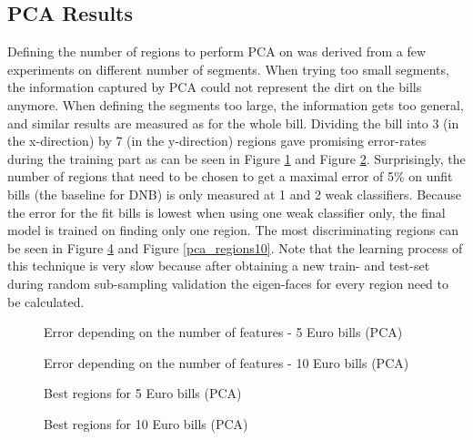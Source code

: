 \documentclass[11pt,twocolumn]{article}
\begin{document}
		\subsection{PCA Results}\label{sec:pca_results}
			Defining the number of regions to perform PCA on was derived from a few experiments on different number of segments. When trying too small segments, the information captured by PCA could not represent the dirt on the bills anymore. When defining the segments too large, the information gets too general, and similar results are measured as for the whole bill. Dividing the bill into 3 (in the x-direction) by 7 (in the y-direction) regions gave promising error-rates during the training part as can be seen in Figure \ref{pca_plot5} and Figure \ref{pca_plot10}. Surprisingly, the number of regions that need to be chosen to get a maximal error of 5\% on unfit bills (the baseline for DNB) is only measured at 1 and 2 weak classifiers. Because the error for the fit bills is lowest when using one weak classifier only, the final model is trained on finding only one region. The most discriminating regions can be seen in Figure \ref{pca_regions5} and Figure \ref{pca_regions10}. Note that the learning process of this technique is very slow because after obtaining a new train- and test-set during random sub-sampling validation the eigen-faces for every region need to be calculated.

		\begin{figure}[!hbtp]
			\centering
			\caption{Error depending on the number of features - 5 Euro bills (PCA)}
			\label{pca_plot5}
		\end{figure}

		\begin{figure}[!hbtp]
			\centering
			\caption{Error depending on the number of features - 10 Euro bills (PCA)}
			\label{pca_plot10}
		\end{figure}

		\begin{figure}[!hbtp]
			\centering
			\caption{Best regions for 5 Euro bills (PCA)}
			\label{pca_regions5}
		\end{figure}
		\begin{figure}[!hbtp]
			\centering
			\caption{Best regions for 10 Euro bills (PCA)}
			\label{pca_regions5}
		\end{figure}
		
\end{document}
